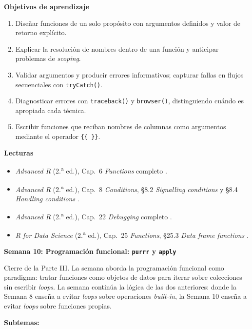 \documentclass[11pt,letterpaper]{article}
\newcommand{\semana}[2]{%
  \bigskip%
  {\color{main}\Large\bfseries Semana #1: #2\par}%
  \smallskip%
}
\begin{document}
\medskip
\noindent\textbf{Objetivos de aprendizaje}
\begin{enumerate}[leftmargin=*, itemsep=1pt]
    \item Diseñar funciones de un solo propósito con argumentos definidos y valor de retorno explícito.
    \item Explicar la resolución de nombres dentro de una función y anticipar problemas de \textit{scoping}.
    \item Validar argumentos y producir errores informativos; capturar fallas en flujos secuenciales con \texttt{tryCatch()}.
    \item Diagnosticar errores con \texttt{traceback()} y \texttt{browser()}, distinguiendo cuándo es apropiada cada técnica.
    \item Escribir funciones que reciban nombres de columnas como argumentos mediante el operador \texttt{\{\{~\}\}}.
\end{enumerate}

\medskip
\noindent\textbf{Lecturas}
\begin{itemize}[leftmargin=*, itemsep=1pt]
    \item \textit{Advanced R} (2.\textsuperscript{a} ed.), Cap.\ 6 \textit{Functions} completo \cite{wickham2019advr}.
    \item \textit{Advanced R} (2.\textsuperscript{a} ed.), Cap.\ 8 \textit{Conditions}, §8.2 \textit{Signalling conditions} y §8.4 \textit{Handling conditions} \cite{wickham2019advr}.
    \item \textit{Advanced R} (2.\textsuperscript{a} ed.), Cap.\ 22 \textit{Debugging} completo \cite{wickham2019advr}.
    \item \textit{R for Data Science} (2.\textsuperscript{a} ed.), Cap.\ 25 \textit{Functions}, §25.3 \textit{Data frame functions} \cite{wickham2023r4ds}.
\end{itemize}

\semana{10}{Programación funcional: \texttt{purrr} y \texttt{apply}}

Cierre de la Parte III. La semana aborda la programación funcional como paradigma: tratar funciones como objetos de datos para iterar sobre colecciones sin escribir \textit{loops}. La semana continúa la lógica de las dos anteriores: donde la Semana 8 enseña a evitar \textit{loops} sobre operaciones \textit{built-in}, la Semana 10 enseña a evitar \textit{loops} sobre funciones propias.

\textbf{Subtemas:}
\end{document}
